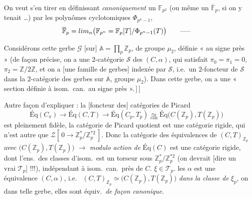 \documentclass[11pt,a4paper]{article}
\begin{document}

On veut s'en tirer en définissant \emph{canoniquement} un
$\mathbb{F}_{p^{2}}$ (ou même un $\overline{\mathbb{F}}_{p}$, si on y
tenait …) par les polynômes cyclotomiques $\Phi_{p^{n}-1}$,
\[
  \overline{\mathbb{F}}_{p} = \varinjlim_{n}
  \bigl( \mathbb{F}_{p^{n}} = \mathbb{F}_{p}[T]/\Phi_{p^{n}-1}(T) \bigr) \qquad
  \text{-----}
\]

Considérons cette gerbe $\mathcal{G}$  [sur]
$\mathbb{A} = \prod_{p} \mathbb{Z}_{p}$, de groupe $\mu_{2}$, définie « au
signe près » (de façon précise, on a une $2$-catégorie $\mathcal{S}$ des
$(C, \alpha)$, qui satisfait $\pi_{0} = \pi_{1} = 0$,
$\pi_{2} = \mathbb{Z}/2\mathbb{Z}$, et \struck{\ill{}} on a [une famille de
gerbes] \struck{\ill{}} indexée par $\mathcal{S}$, i.e.\ un $2$-foncteur de
$\mathcal{S}$ dans la $2$-catégorie des gerbes sur
$\mathbb{A}$, groupe $\mu_{2}$). Dans cette gerbe, on a une « section
définie à isom.\ can.\ au signe près ».\,]\,]


Autre façon d'expliquer : la  [foncteur des]
catégories de Picard 
\[
  \text{Éq}(C_{\pi}) \longrightarrow \text{Éq}(C, T) \longrightarrow
  \text{Éq}(C_{p}, T_{p}) \underset{\mathrm{can}}{\simeq}
  \text{Éq}\bigl(C(\mathbb{Z}_{p}), T(\mathbb{Z}_{p})\bigr)
\]
est pleinement fidèle, la catégorie de Picard quotient est
\struck{\ill{}} une catégorie rigide, qui n'est autre que
$\mathcal{Z}[\,0 \to \mathbb{Z}_{p}^{*}/\mathbb{Z}_{p}^{*2}\,]$. Donc la
catégorie des équivalences de $(C, T)_{\mathbb{Z}_{p}}$ avec
$\bigl(C(\mathbb{Z}_{p}), T(\mathbb{Z}_{p})\bigr)$ $\longrightarrow$
\emph{modulo action de} $\text{Éq}(C)$ est une catégorie rigide,
 dont l'ens.\ des classes d'isom.\ est un torseur
 sous $\mathbb{Z}_{p}^{*}/\mathbb{Z}_{p}^{*2}$ (on devrait
 [dire un vrai $\mathcal{T}_{p}$] !!!), indépendant à
isom.\ can.\ près de $C$. 
$\xi \in \mathcal{T}_{p}$.
 les
 \ill{} $\alpha$ est une équivalence
$(C, \alpha)$, i.e.\ \ill{}
$(C, T)_{\mathbb{Z}_{p}} \simeq \bigl(C(\mathbb{Z}_{p}), T(\mathbb{Z}_{p})\bigr)$
\emph{dans la classe de} $\xi_{p}$, on \ill{} dans telle gerbe, elles sont
 équiv.\ \emph{de façon canonique}.
\end{document}
